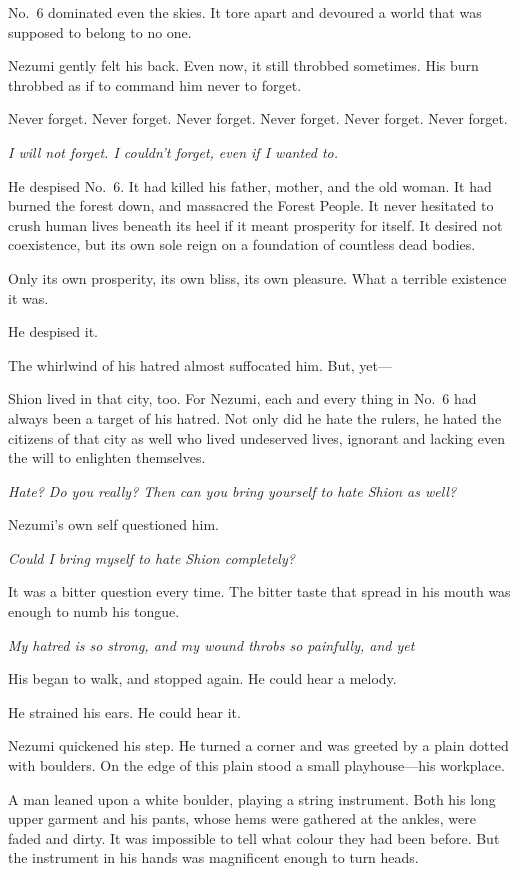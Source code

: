 No.~6 dominated even the skies. It tore apart and devoured a world that
was supposed to belong to no one.

Nezumi gently felt his back. Even now, it still throbbed sometimes. His
burn throbbed as if to command him never to forget.

Never forget. Never forget. Never forget. Never forget. Never forget.
Never forget.

\emph{I will not forget. I couldn't forget, even if I wanted to.}

He despised No.~6. It had killed his father, mother, and the old woman.
It had burned the forest down, and massacred the Forest People. It never
hesitated to crush human lives beneath its heel if it meant prosperity
for itself. It desired not coexistence, but its own sole reign on a
foundation of countless dead bodies.

Only its own prosperity, its own bliss, its own pleasure. What a
terrible existence it was.

He despised it.

The whirlwind of his hatred almost suffocated him. But, yet---

Shion lived in that city, too. For Nezumi, each and every thing in No.~6
had always been a target of his hatred. Not only did he hate the rulers,
he hated the citizens of that city as well who lived undeserved lives,
ignorant and lacking even the will to enlighten themselves.

\emph{Hate? Do you really? Then can you bring yourself to hate Shion as well?}

Nezumi's own self questioned him.

\emph{Could I bring myself to hate Shion completely?}

It was a bitter question every time. The bitter taste that spread in his
mouth was enough to numb his tongue.

\emph{My hatred is so strong, and my wound throbs so painfully, and yet\el }

His began to walk, and stopped again. He could hear a melody.

He strained his ears. He could hear it.

Nezumi quickened his step. He turned a corner and was greeted by a plain
dotted with boulders. On the edge of this plain stood a small
playhouse---his workplace.

A man leaned upon a white boulder, playing a string instrument. Both his
long upper garment and his pants, whose hems were gathered at the
ankles, were faded and dirty. It was impossible to tell what colour they
had been before. But the instrument in his hands was magnificent enough
to turn heads.

